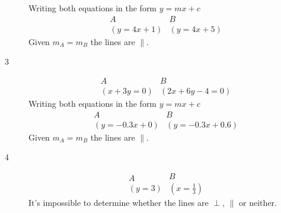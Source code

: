 \documentclass{article}
\begin{document}
\begin{description}
        Writing both equations in the form $y=mx+c$
        $$
            \begin{array}{c}
                A \\
                (y=4x+1)
            \end{array}
            \begin{array}{c}
                B \\
                (y=4x+5)
            \end{array}
        $$
        Given $m_A = m_B$ the lines are $\parallel$.
    \item[3]
        $$
            \begin{array}{c}
                A \\
                (x+3y=0)
            \end{array}
            \begin{array}{c}
                B \\
                (2x+6y-4=0)
            \end{array}
        $$
        Writing both equations in the form $y=mx+c$
        $$
            \begin{array}{c}
                A \\
                (y = -0.3x + 0)
            \end{array}
            \begin{array}{c}
                B \\
                (y = -0.3x+0.6)
            \end{array}
        $$
        Given $m_A = m_B$ the lines are $\parallel$.
    \item[4]
        $$
            \begin{array}{c}
                A \\
                (y=3)
            \end{array}
            \begin{array}{c}
                B \\
                (x=\frac{1}{3})
            \end{array}
        $$
        It's impossible to determine whether the lines are $\perp$, $\parallel$ or neither.

\end{description}
\end{document}
